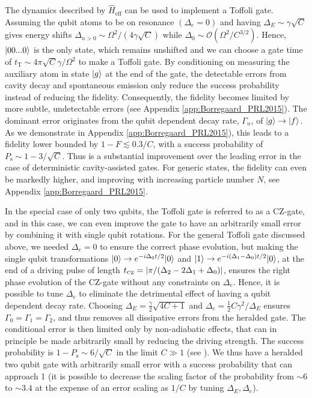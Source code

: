 The dynamics described by $\hat{H}_{\text{eff}}$ can be used to implement a
Toffoli gate. Assuming the qubit atoms to be on resonance $(\Delta_{e}=0)$ and
having $\Delta_{E}\sim\gamma\sqrt{C}$ gives energy shifts
$\Delta_{n>0}\sim\Omega^{2}/(4\gamma\sqrt{C})$ while
$\Delta_{0}\sim\mathcal{O}(\Omega^{2}/C^{3/2})$. Hence, $| 00...0 \rangle$ is the
only state, which remains unshifted and we can choose a gate time of
$t_{\text{T}}\sim4\pi\sqrt{C}\gamma/\Omega^{2}$ to make a Toffoli gate. By
conditioning on measuring the auxiliary atom in state $| g \rangle$ at the end of
the gate, the detectable errors from cavity decay and spontaneous emission only
reduce the success probability instead of reducing the fidelity. Consequently,
the fidelity becomes limited by more subtle, undetectable errors (see
Appendix \ref{app:Borregaard_PRL2015}). The dominant error originates from the
qubit dependent decay rate, $\Gamma_{n}$, of $| g \rangle\to| f \rangle$. As we
demonstrate in Appendix \ref{app:Borregaard_PRL2015}), this leads to a fidelity lower bounded by $1-F
\lesssim 0.3/C$, with a success probability of $P_{\text{s}} \sim 1 -
3/\sqrt{C}$. Thus is a substantial improvement over the leading error in the
case of deterministic cavity-assisted gates. For generic states, the fidelity
can even be markedly higher, and improving with increasing particle number $N$,
see Appendix \ref{app:Borregaard_PRL2015}.

In the special case of only two qubits, the Toffoli gate is referred to as a
CZ-gate, and in this case, we can even improve the gate to have an arbitrarily
small error by combining it with single qubit rotations. For the general Toffoli
gate discussed above, we needed $\Delta_e=0$ to ensure the correct phase
evolution, but making the single qubit transformations $| 0 \rangle\to
e^{-i\Delta_{0}t/2}| 0 \rangle$ and $| 1 \rangle\to
e^{-i(\Delta_{1}-\Delta_{0})t/2}| 0 \rangle$, at the end of a driving pulse of
length $t_{\mbox{\tiny CZ}}=\left| \pi/(\Delta_{2}-2\Delta_{1}+\Delta_{0}) \right|$, ensures
the right phase evolution of the CZ-gate without any constraints on
$\Delta_{e}$. Hence, it is possible to tune $\Delta_{e}$ to eliminate the
detrimental effect of having a qubit dependent decay rate. Choosing
$\Delta_{E}=\frac{\gamma}{2}\sqrt{4C+1}$ and
$\Delta_{e}=\frac{1}{2}C\gamma^{2}/\Delta_{E}$ ensures
$\Gamma_0=\Gamma_1=\Gamma_2$, and thus removes all dissipative errors from the
heralded gate. The conditional error is then limited only by non-adiabatic
effects, that can in principle be made arbitrarily small by reducing the driving
strength. The success probability is $1-P_{\text{s}}\sim 6/\sqrt{C}$ in the
limit $C\gg1$ (see ).
We thus have a heralded two qubit gate with arbitrarily small error with a
success probability that can approach 1 (it is possible to decrease the scaling
factor of the probability from $\sim6$ to $\sim3.4$ at the expense of an error
scaling as $1/C$ by tuning $\Delta_{E},\Delta_{e}$).

